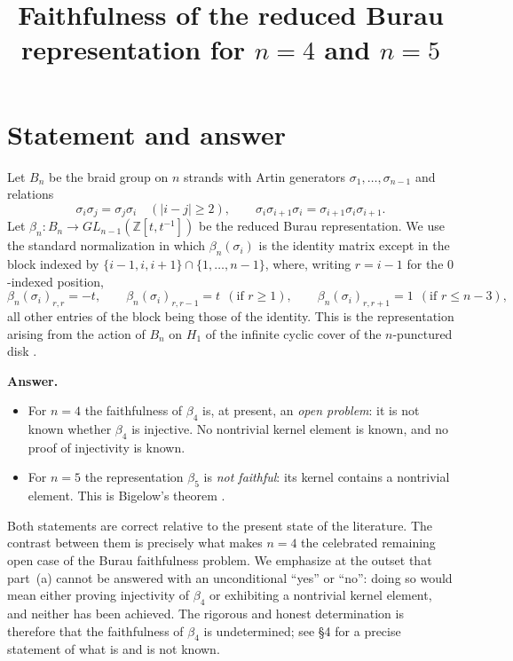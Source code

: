 \documentclass{amsart}
\theoremstyle{remark}
\begin{document}
\title{Faithfulness of the reduced Burau representation for $n=4$ and $n=5$}
\maketitle

\section*{Statement and answer}

Let $B_n$ be the braid group on $n$ strands with Artin generators
$\sigma_1,\dots,\sigma_{n-1}$ and relations
\[
\sigma_i\sigma_j=\sigma_j\sigma_i \quad(|i-j|\ge 2),\qquad
\sigma_i\sigma_{i+1}\sigma_i=\sigma_{i+1}\sigma_i\sigma_{i+1}.
\]
Let $\beta_n:B_n\to GL_{n-1}(\mathbb Z[t,t^{-1}])$ be the reduced Burau
representation. We use the standard normalization in which $\beta_n(\sigma_i)$
is the identity matrix except in the block indexed by
$\{i-1,i,i+1\}\cap\{1,\dots,n-1\}$, where, writing $r=i-1$ for the $0$-indexed
position,
\begin{equation}\label{eq:burau}
\beta_n(\sigma_i)_{r,r}=-t,\qquad
\beta_n(\sigma_i)_{r,r-1}=t \ \ (\text{if }r\ge 1),\qquad
\beta_n(\sigma_i)_{r,r+1}=1 \ \ (\text{if }r\le n-3),
\end{equation}
all other entries of the block being those of the identity. This is the
representation arising from the action of $B_n$ on $H_1$ of the infinite
cyclic cover of the $n$-punctured disk \cite[\S3.3]{KasselTuraev}.

\medskip
\noindent\textbf{Answer.}
\begin{itemize}
\item[(a)] For $n=4$ the faithfulness of $\beta_4$ is, at present, an
\emph{open problem}: it is not known whether $\beta_4$ is injective. No
nontrivial kernel element is known, and no proof of injectivity is known.
\item[(b)] For $n=5$ the representation $\beta_5$ is \emph{not faithful}: its
kernel contains a nontrivial element. This is Bigelow's theorem
\cite{Bigelow1999}.
\end{itemize}

\noindent
Both statements are correct relative to the present state of the literature.
The contrast between them is precisely what makes $n=4$ the celebrated remaining
open case of the Burau faithfulness problem. We emphasize at the outset that
part~(a) cannot be answered with an unconditional ``yes'' or ``no'': doing so
would mean either proving injectivity of $\beta_4$ or exhibiting a nontrivial
kernel element, and neither has been achieved. The rigorous and honest
determination is therefore that the faithfulness of $\beta_4$ is undetermined;
see \S4 for a precise statement of what is and is not known.
\end{document}

